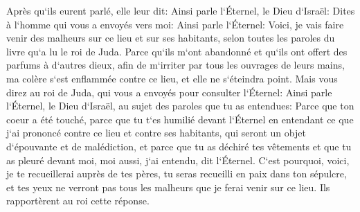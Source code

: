 \verse Après qu`ils eurent parlé, elle leur dit: Ainsi parle l`Éternel, le Dieu d`Israël: Dites à l`homme qui vous a envoyés vers moi: 
\verse Ainsi parle l`Éternel: Voici, je vais faire venir des malheurs sur ce lieu et sur ses habitants, selon toutes les paroles du livre qu`a lu le roi de Juda. 
\verse Parce qu`ils m`ont abandonné et qu`ils ont offert des parfums à d`autres dieux, afin de m`irriter par tous les ouvrages de leurs mains, ma colère s`est enflammée contre ce lieu, et elle ne s`éteindra point. 
\verse Mais vous direz au roi de Juda, qui vous a envoyés pour consulter l`Éternel: Ainsi parle l`Éternel, le Dieu d`Israël, au sujet des paroles que tu as entendues: 
\verse Parce que ton coeur a été touché, parce que tu t`es humilié devant l`Éternel en entendant ce que j`ai prononcé contre ce lieu et contre ses habitants, qui seront un objet d`épouvante et de malédiction, et parce que tu as déchiré tes vêtements et que tu as pleuré devant moi, moi aussi, j`ai entendu, dit l`Éternel. 
\verse C`est pourquoi, voici, je te recueillerai auprès de tes pères, tu seras recueilli en paix dans ton sépulcre, et tes yeux ne verront pas tous les malheurs que je ferai venir sur ce lieu. Ils rapportèrent au roi cette réponse. 

